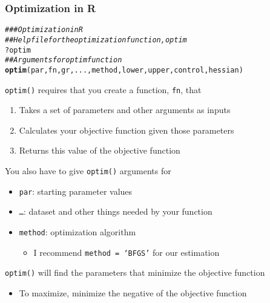\documentclass{beamer}\usepackage[]{graphicx}\usepackage[]{color}
\makeatletter
\newcommand{\hlcom}[1]{\textcolor[rgb]{0.678,0.584,0.686}{\textit{#1}}}%
\newcommand{\hlopt}[1]{\textcolor[rgb]{0,0,0}{#1}}%
\newcommand{\hlstd}[1]{\textcolor[rgb]{0.345,0.345,0.345}{#1}}%
\newcommand{\hlkwd}[1]{\textcolor[rgb]{0.737,0.353,0.396}{\textbf{#1}}}%
\newenvironment{kframe}{%
 \def\at@end@of@kframe{}%
 \ifinner\ifhmode%
  \def\at@end@of@kframe{\end{minipage}}%
  \begin{minipage}{\columnwidth}%
 \fi\fi%
 \def\FrameCommand##1{\hskip\@totalleftmargin \hskip-\fboxsep
 \colorbox{shadecolor}{##1}\hskip-\fboxsep
     \hskip-\linewidth \hskip-\@totalleftmargin \hskip\columnwidth}%
 \MakeFramed {\advance\hsize-\width
   \@totalleftmargin\z@ \linewidth\hsize
   \@setminipage}}%
 {\par\unskip\endMakeFramed%
 \at@end@of@kframe}
\newenvironment{knitrout}{}{} %
\makeatother
\begin{document}
\begin{frame}[fragile]\frametitle{Optimization in R}
\begin{knitrout}\footnotesize
{}\color{fgcolor}\begin{kframe}
\begin{alltt}
\hlcom{### Optimization in R}
\hlcom{## Help file for the optimization function, optim}
\hlopt{?}\hlstd{optim}
\hlcom{## Arguments for optim function}
\hlkwd{optim}\hlstd{(par, fn, gr, ..., method, lower, upper, control, hessian)}
\end{alltt}
\end{kframe}
\end{knitrout}
    \vspace{1ex}
    \texttt{optim()} requires that you create a function, \texttt{fn}, that
    \begin{enumerate}
        \item Takes a set of parameters and other arguments as inputs
        \item Calculates your objective function given those parameters
        \item Returns this value of the objective function
    \end{enumerate}
    \vspace{1ex}
    You also have to give \texttt{optim()} arguments for
    \begin{itemize}
        \item \texttt{par}: starting parameter values
        \item \texttt{\ldots}: dataset and other things needed by your function
        \item \texttt{method}: optimization algorithm
        \begin{itemize}
            \item I recommend \texttt{method = `BFGS'} for our estimation
        \end{itemize}
    \end{itemize}
    \vspace{1ex}
    \texttt{optim()} will find the parameters that minimize the objective function
    \begin{itemize}
        \item To maximize, minimize the negative of the objective function
    \end{itemize}
\end{frame}
\end{document}

